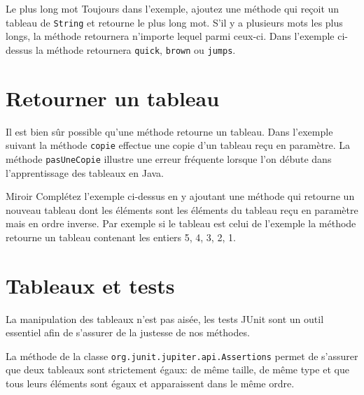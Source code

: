 \documentclass[a4paper,11pt]{style-esi/td}
\begin{document}
	\begin{Exercice}{Le plus long mot}
		Toujours dans l'exemple, ajoutez
		 une méthode  
			qui reçoit un tableau de \texttt{String} et retourne le 
			plus long mot. S'il y a plusieurs mots les plus longs, la méthode
			retournera n'importe lequel parmi ceux-ci. 
			Dans l'exemple ci-dessus la méthode retournera
			 \texttt{quick}, \texttt{brown} ou \texttt{jumps}.
				
	\end{Exercice}
	
	


\section{Retourner un tableau}

	Il est bien sûr possible qu'une méthode retourne un tableau.
	Dans l'exemple suivant la méthode \texttt{copie} 
	effectue une copie d'un tableau reçu en paramètre. 
	La méthode \texttt{pasUneCopie} illustre une erreur fréquente
	lorsque l'on débute dans l'apprentissage des tableaux en Java.
	

	\begin{Exercice}{Miroir}	
		Complétez l'exemple ci-dessus en y ajoutant une méthode 
			qui retourne un nouveau tableau dont les éléments sont les 
			éléments du tableau reçu en paramètre mais en ordre inverse. 
			Par exemple si le tableau est celui de l'exemple la méthode 		
			 retourne un tableau contenant les entiers 5, 4, 3, 2, 1.
	\end{Exercice}



\section{Tableaux et tests}

	La manipulation des tableaux n'est pas aisée, les tests JUnit 
	sont un outil essentiel afin de s'assurer de la justesse de nos méthodes.
	
	La méthode  de la classe \texttt{org.junit.jupiter.api.Assertions}
	permet de s'assurer que deux tableaux sont strictement égaux: de même taille, 
	de même type et que tous leurs éléments sont égaux et 
	apparaissent dans le même ordre.
\end{document}
